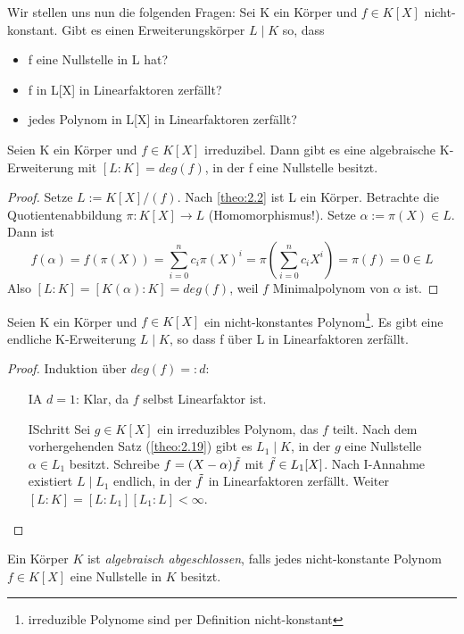 \documentclass[../main.tex]{subfiles}
\begin{document}
Wir stellen uns nun die folgenden Fragen: Sei K ein Körper und $f \in K[X]$ nicht-konstant. Gibt es einen Erweiterungskörper $L \mid K$ so, dass
\begin{itemize}
    \item f eine Nullstelle in L hat?
    \item f in L[X] in Linearfaktoren zerfällt?
    \item jedes Polynom in L[X] in Linearfaktoren zerfällt?
\end{itemize}
\begin{theorem} \label{theo:2.19}
    Seien K ein Körper und $f \in K[X]$ irreduzibel. Dann gibt es eine algebraische K-Erweiterung mit $[L:K] = deg(f)$, in der f eine Nullstelle besitzt.
\end{theorem}
\begin{proof}

    Setze $L := K[X]/(f)$. Nach \cref{theo:2.2} ist L ein Körper. Betrachte die Quotientenabbildung $\pi: K[X] \rightarrow L$ (Homomorphismus!). Setze $\alpha := \pi(X) \in L$. Dann ist 
    $$f(\alpha) = f\left(\pi(X)\right) = \sum_{i=0}^n c_i\pi(X)^i = \pi\left(\sum_{i=0}^n c_iX^i\right) = \pi(f) = 0 \in L$$
    Also $[L:K] = [K(\alpha):K] = deg(f)$, weil $f$ Minimalpolynom von $\alpha$ ist.
\end{proof}
\begin{corollary}\label{theo:2.20}
Seien K ein Körper und $f \in K[X]$ ein nicht-konstantes Polynom\footnote{irreduzible Polynome sind per Definition nicht-konstant}. Es gibt eine endliche K-Erweiterung $L \mid K$, so dass f über L in Linearfaktoren zerfällt.
\end{corollary}
\begin{proof}
    Induktion über $deg(f) =: d$:
    \begin{itemize}
        \item[IA] $d = 1$: Klar, da $f$ selbst Linearfaktor ist.
        \item[ISchritt] Sei $g \in K[X]$ ein irreduzibles Polynom, das $f$ teilt. Nach dem vorhergehenden Satz (\cref{theo:2.19}) gibt es $L_1 \mid K$, in der $g$ eine Nullstelle $\alpha \in L_1$ besitzt. Schreibe $f = (X-\alpha)\Tilde{f}$ mit $\Tilde{f} \in L_1[X]$. Nach I-Annahme existiert $L \mid L_1$ endlich, in der $\Tilde{f}$ in Linearfaktoren zerfällt. Weiter $[L:K] = [L:L_1][L_1:L] < \infty$.
    \end{itemize}
\end{proof}
\begin{definition}
    Ein Körper $K$ ist \emph{algebraisch abgeschlossen}, falls jedes nicht-konstante Polynom $f \in K[X]$ eine Nullstelle in $K$ besitzt.
\end{definition}
\end{document}
